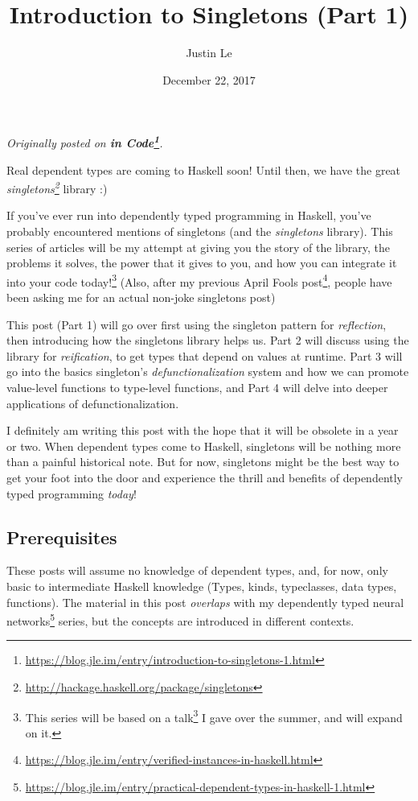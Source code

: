 \documentclass[]{article}
\title{Introduction to Singletons (Part 1)}
\author{Justin Le}
\date{December 22, 2017}
\renewcommand{\href}[2]{#2\footnote{\url{#1}}}
\begin{document}
\maketitle

\emph{Originally posted on
\textbf{\href{https://blog.jle.im/entry/introduction-to-singletons-1.html}{in
Code}}.}

Real dependent types are coming to Haskell soon! Until then, we have the great
\emph{\href{http://hackage.haskell.org/package/singletons}{singletons}} library
:)

If you've ever run into dependently typed programming in Haskell, you've
probably encountered mentions of singletons (and the \emph{singletons} library).
This series of articles will be my attempt at giving you the story of the
library, the problems it solves, the power that it gives to you, and how you can
integrate it into your code today!\footnote{This series will be based on
  \href{http://talks.jle.im/lambdaconf-2017/singletons/}{a talk} I gave over the
  summer, and will expand on it.} (Also, after
\href{https://blog.jle.im/entry/verified-instances-in-haskell.html}{my previous
April Fools post}, people have been asking me for an actual non-joke singletons
post)

This post (Part 1) will go over first using the singleton pattern for
\emph{reflection}, then introducing how the singletons library helps us. Part 2
will discuss using the library for \emph{reification}, to get types that depend
on values at runtime. Part 3 will go into the basics singleton's
\emph{defunctionalization} system and how we can promote value-level functions
to type-level functions, and Part 4 will delve into deeper applications of
defunctionalization.

I definitely am writing this post with the hope that it will be obsolete in a
year or two. When dependent types come to Haskell, singletons will be nothing
more than a painful historical note. But for now, singletons might be the best
way to get your foot into the door and experience the thrill and benefits of
dependently typed programming \emph{today}!

\subsection{Prerequisites}\label{prerequisites}

These posts will assume no knowledge of dependent types, and, for now, only
basic to intermediate Haskell knowledge (Types, kinds, typeclasses, data types,
functions). The material in this post \emph{overlaps} with my
\href{https://blog.jle.im/entry/practical-dependent-types-in-haskell-1.html}{dependently
typed neural networks} series, but the concepts are introduced in different
contexts.
\end{document}
